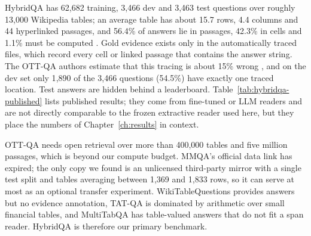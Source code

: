 HybridQA has 62{,}682 training, 3{,}466 dev and 3{,}463 test questions over roughly 13{,}000 Wikipedia tables; an average table has about 15.7 rows, 4.4 columns and 44 hyperlinked passages, and 56.4\% of answers lie in passages, 42.3\% in cells and 1.1\% must be computed \citep{chen-etal-2020-hybridqa}. Gold evidence exists only in the automatically traced files, which record every cell or linked passage that contains the answer string. The OTT-QA authors estimate that this tracing is about 15\% wrong \citep{chen2021open}, and on the dev set only 1{,}890 of the 3{,}466 questions (54.5\%) have exactly one traced location. Test answers are hidden behind a leaderboard. Table~\ref{tab:hybridqa-published} lists published results; they come from fine-tuned or LLM readers and are not directly comparable to the frozen extractive reader used here, but they place the numbers of Chapter~\ref{ch:results} in context.

OTT-QA needs open retrieval over more than 400{,}000 tables and five million passages, which is beyond our compute budget. MMQA's official data link has expired; the only copy we found is an unlicensed third-party mirror with a single test split and tables averaging between 1{,}369 and 1{,}833 rows, so it can serve at most as an optional transfer experiment. WikiTableQuestions \citep{pasupat-liang-2015-compositional} provides answers but no evidence annotation, TAT-QA \citep{zhu-etal-2021-tat} is dominated by arithmetic over small financial tables, and MultiTabQA \citep{pal-etal-2023-multitabqa} has table-valued answers that do not fit a span reader. HybridQA is therefore our primary benchmark.

